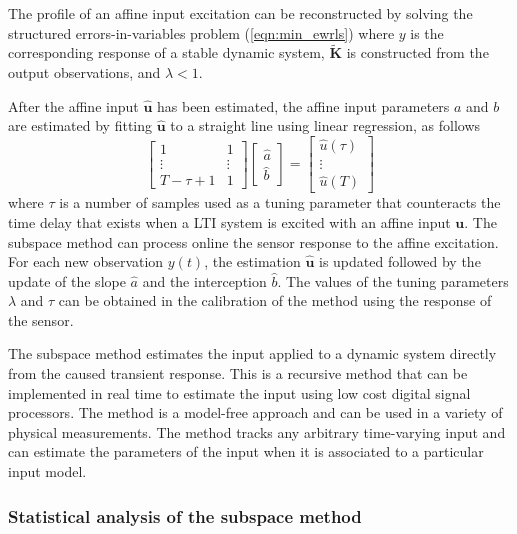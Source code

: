 The profile of an affine input excitation can be reconstructed by solving the structured errors-in-variables problem  (\ref{eqn:min_ewrls}) where $y$ is the corresponding response of a stable dynamic system, $\widetilde{\mathbf{K}}$ is constructed from the output observations, and $\lambda<1$.

After the affine input $\widehat{\mathbf{u}}$ has been estimated, the affine input parameters $a$ and $b$ are estimated by fitting $\widehat{\mathbf{u}}$ to a straight line using linear regression, as follows
\begin{equation} 
  \begin{bmatrix} 1 & 1  \\ \vdots & \vdots \\ T-\tau+1 & 1 \end{bmatrix} 
  \begin{bmatrix} \widehat{a} \\ \widehat{b}  \end{bmatrix} = 
  \begin{bmatrix} \widehat{u}(\tau) \\ \vdots \\ \widehat{u}(T) \end{bmatrix} \label{eqn:LS}
\end{equation}
where $\tau$ is a number of samples used as a tuning parameter that counteracts the time delay that exists when a LTI system is excited with an affine input $\mathbf{u}$.
The subspace method can process online the sensor response to the affine excitation.
For each new observation $y(t)$, the estimation $\widehat{\mathbf{u}}$ is updated followed by the update of the slope $\widehat{a}$ and the interception $\widehat{b}$.
The values of the tuning parameters $\lambda$ and $\tau$ can be obtained in the calibration of the method using the response of the sensor.

The subspace method estimates the input applied to a dynamic system directly from the caused transient response.
This is a recursive method that can be implemented in real time to estimate the input  using low cost digital signal processors.
The method is a model-free approach and can be used in a variety of physical measurements.
The method  tracks any arbitrary time-varying input and can estimate the parameters of the input when it is associated to a particular input model.


\subsubsection{Statistical analysis of the subspace method}

